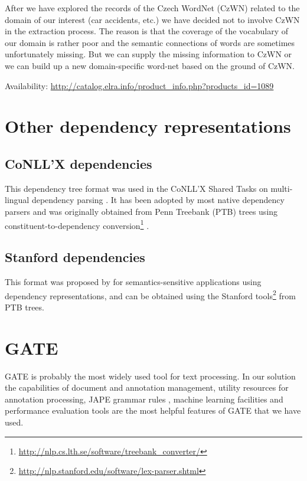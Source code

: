 After we have explored the records of the Czech WordNet (CzWN) related to the domain of our interest (car accidents, etc.) we have decided not to involve CzWN in the extraction process. The reason is that the coverage of the vocabulary of our domain is rather poor and the semantic connections of words are sometimes unfortunately missing. But we can supply the missing information to CzWN or we can build up a new domain-specific word-net based on the ground of CzWN.  

\medskip
Availability: \url{http://catalog.elra.info/product_info.php?products_id=1089}


\section{Other dependency representations} 
\subsection{CoNLL’X dependencies} 
This dependency
tree format was used in the CoNLL’X
Shared Tasks on multi-lingual dependency
parsing \citep{Buchholz2006CoNLLX}. It has been adopted
by most native dependency parsers and was
originally obtained from Penn Treebank (PTB)
trees using constituent-to-dependency conversion\footnote{\url{http://nlp.cs.lth.se/software/treebank_converter/}} \citep{johansson2007a}.


\subsection{Stanford dependencies}

This format was
proposed by \cite{stanfordDeps} for
semantics-sensitive applications using dependency
representations, and can be obtained using
the Stanford tools\footnote{\url{http://nlp.stanford.edu/software/lex-parser.shtml}} from PTB trees. 






\section{GATE} \label{sec:third_gate}

GATE \citep{biblio:GATE_ACL2002} is probably the most widely used tool for text processing. In our solution the capabilities of document and annotation management, utility resources for annotation processing, JAPE grammar rules \citep{Cunningham00jape:a}, machine learning facilities and performance evaluation tools are the most helpful features of GATE that we have used.


